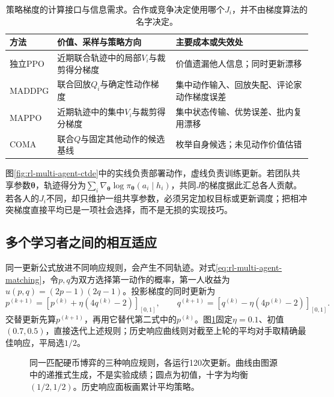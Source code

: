 \begin{table}[htbp]
 \centering
 \begin{tabularx}{\linewidth}{@{}l >{\raggedright\arraybackslash}X >{\raggedright\arraybackslash}X@{}}
 \toprule
 方法 & 价值、采样与策略方向 & 主要成本或失效处\\
 \midrule
 独立PPO & 近期联合轨迹中的局部$V_i$与裁剪得分梯度 & 价值遗漏他人信息；同时更新漂移\\
 MADDPG & 联合回放$Q_i$与确定性动作梯度 & 集中动作输入、回放失配、评论家动作梯度误差\\
 MAPPO & 近期轨迹中的集中$V_i$与裁剪得分梯度 & 集中状态传输、优势误差、批内复用漂移\\
 COMA & 联合$Q$与固定其他动作的候选基线 & 枚举自身候选；未见动作价值估错\\
 \bottomrule
 \end{tabularx}
 \caption{策略梯度的计算接口与信息需求。合作或竞争决定使用哪个$J_i$，并不由梯度算法的名字决定。}
 \label{tab:rl-multi-agent-policy-updates}
\end{table}

图\ref{fig:rl-multi-agent-ctde}中的实线负责部署动作，虚线负责训练更新。若团队共享参数$\bm\theta$，轨迹得分为$\sum_i\nabla_{\bm\theta}\log\pi_{\bm\theta}(a_i\mid h_i)$，共同$J$的梯度据此汇总各人贡献。若各人的$J_i$不同，却只维护一组共享参数，必须另定加权目标或更新调度；把相冲突梯度直接平均已是一项社会选择，而不是无损的实现技巧。

\subsection{多个学习者之间的相互适应}
\label{sec:rl-multi-agent-mutual-learning}

同一更新公式放进不同响应规则，会产生不同轨迹。对式\eqref{eq:rl-multi-agent-matching}，令$p,q$为双方选择第一动作的概率，第一人收益为$u(p,q)=(2p-1)(2q-1)$。投影梯度的同时更新为
\[
 p^{(k+1)}=[p^{(k)}+\eta(4q^{(k)}-2)]_{[0,1]},\qquad
 q^{(k+1)}=[q^{(k)}-\eta(4p^{(k)}-2)]_{[0,1]}.
\]
交替更新先算$p^{(k+1)}$，再用它替代第二式中的$p^{(k)}$。图\ref{fig:rl-multi-agent-trajectories}固定$\eta=0.1$、初值$(0.7,0.5)$，直接迭代上述规则；历史响应曲线则对截至上轮的平均对手取精确最佳响应，平局选$1/2$。

\begin{figure}[htbp]
 \centering
 
 \caption{同一匹配硬币博弈的三种响应规则，各运行120次更新。曲线由图源中的递推式生成，不是实验成绩；圆点为初值，十字为均衡$(1/2,1/2)$。历史响应面板画累计平均策略。}
 \label{fig:rl-multi-agent-trajectories}
\end{figure}

